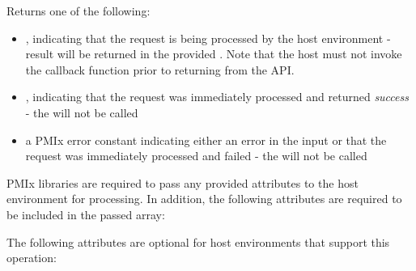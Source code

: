 \begin{arglist}
\end{arglist}

Returns one of the following:

\begin{itemize}
    \item {}, indicating that the request is being processed by the host environment - result will be returned in the provided . Note that the host must not invoke the callback function prior to returning from the \ac{API}.
    \item {}, indicating that the request was immediately processed and returned \textit{success} - the  will not be called
    \item a PMIx error constant indicating either an error in the input or that the request was immediately processed and failed - the  will not be called
\end{itemize}

\reqattrstart
\ac{PMIx} libraries are required to pass any provided attributes to the host environment for processing. In addition, the following attributes are required to be included in the passed  array:


\reqattrend


\optattrstart
The following attributes are optional for host environments that support this operation:


